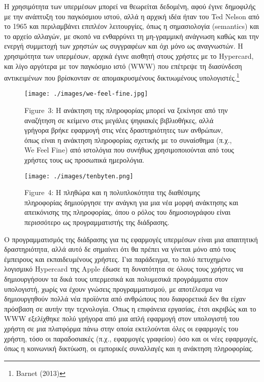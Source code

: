\documentclass[
]{article}
\begin{document}
Η χρησιμότητα των υπερμέσων μπορεί να θεωρείται δεδομένη, αφού έγινε
δημοφιλής με την ανάπτυξη του παγκόσμιου ιστού, αλλά η αρχική ιδέα ήταν
του Ted Nelson από το 1965 και περιλαμβάνει επιπλέον λειτουργίες, όπως η
σημασιολογία (semantics) και το αρχείο αλλαγών, με σκοπό να ενθαρρύνει
τη μη-γραμμική ανάγνωση καθώς και την ενεργή συμμετοχή των χρηστών ως
συγγραφέων και όχι μόνο ως αναγνωστών. Η χρησιμότητα των υπερμέσων,
αρχικά έγινε αισθητή στους χρήστες με το Hypercard, και λίγο αργότερα με
τον παγκόσμιο ιστό (WWW) που επέτρεψε τη διασύνδεση αντικειμένων που
βρίσκονταν σε απομακρυσμένους δικτυωμένους υπολογιστές.\footnote{Barnet
  (2013)}

\leavevmode{}%
\begin{figure}
\hypertarget{fig:we-feel-fine}{%
\centering
\texttt{[image: ./images/we-feel-fine.jpg]}
\caption{Figure~3: Η ανάκτηση της πληροφορίας μπορεί να ξεκίνησε από την
αναζήτηση σε κείμενο στις μεγάλες ψηφιακές βιβλιοθήκες, αλλά γρήγορα
βρήκε εφαρμογή στις νέες δραστηριότητες των ανθρώπων, όπως είναι η
ανάκτηση πληροφορίας σχετικής με το συναίσθημα (π.χ., We Feel Fine) από
ιστολόγια που συνήθως χρησιμοποιούνται από τους χρήστες τους ως
προσωπικά ημερολόγια.}\label{fig:we-feel-fine}
}
\end{figure}

\leavevmode{}%
\begin{figure}
\hypertarget{fig:tenbyten}{%
\centering
\texttt{[image: ./images/tenbyten.png]}
\caption{Figure~4: Η πληθώρα και η πολυπλοκότητα της διαθέσιμης
πληροφορίας δημιούργησε την ανάγκη για μια νέα μορφή ανάκτησης και
απεικόνισης της πληροφορίας, όπου ο ρόλος του δημοσιογράφου είναι
περισσότερο ως προγραμματιστής της διάδρασης.}\label{fig:tenbyten}
}
\end{figure}

Ο προγραμματισμός της διάδρασης για τις εφαρμογές υπερμέσων είναι μια
απαιτητική δραστηριότητα, αλλά αυτό δε σημαίνει ότι θα πρέπει να γίνεται
μόνο από τους έμπειρους και εκπαιδευμένους χρήστες. Για παράδειγμα, το
πολύ πετυχημένο λογισμικό Hypercard της Apple έδωσε τη δυνατότητα σε
όλους τους χρήστες να δημιουργήσουν τα δικά τους υπερμεσικά και
πολυμεσικά προγράμματα στον υπολογιστή, χωρίς να έχουν γνώσεις
προγραμματισμού, με αποτέλεσμα να δημιουργηθούν πολλά νέα προϊόντα από
ανθρώπους που διαφορετικά δεν θα είχαν πρόσβαση σε αυτήν την τεχνολογία.
Όπως η επιφάνεια εργασίας, έτσι ακριβώς και το WWW εξελίχθηκε πολύ
γρήγορα από μια απλή εφαρμογή στον υπολογιστή του χρήστη σε μια
πλατφόρμα πάνω στην οποία εκτελούνται όλες οι εφαρμογές του χρήστη, τόσο
οι παραδοσιακές (π.χ., εφαρμογές γραφείου) όσο και οι νέες εφαρμογές,
όπως η κοινωνική δικτύωση, οι εμπορικές συναλλαγές και η ανάκτηση
πληροφορίας.
\end{document}
